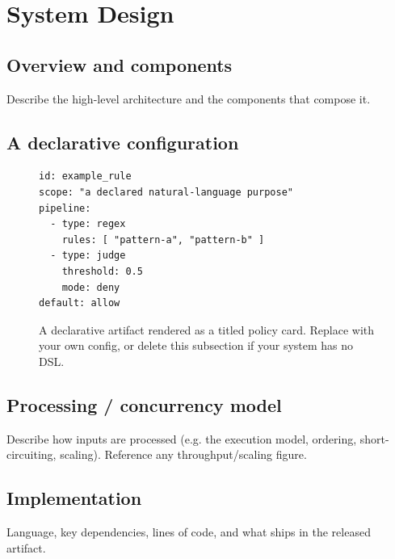 \documentclass[11pt]{article}
\begin{document}
\section{System Design}
\subsection{Overview and components}
Describe the high-level architecture and the components that compose it.

\subsection{A declarative configuration}\label{sec:language}
\begin{figure}[htb]\centering
\begin{tcolorbox}[policycard, cardcol=cardblue, title=Example policy artifact,
  width=0.8\linewidth]
\begin{lstlisting}[style=housespecyamlbare]
id: example_rule
scope: "a declared natural-language purpose"
pipeline:
  - type: regex
    rules: [ "pattern-a", "pattern-b" ]
  - type: judge
    threshold: 0.5
    mode: deny
default: allow
\end{lstlisting}
\end{tcolorbox}
\caption{A declarative artifact rendered as a titled policy card. Replace with your
own config, or delete this subsection if your system has no DSL.}
\label{fig:spec}
\end{figure}

\subsection{Processing / concurrency model}
Describe how inputs are processed (e.g. the execution model, ordering, short-circuiting,
scaling). Reference any throughput/scaling figure.

\subsection{Implementation}
Language, key dependencies, lines of code, and what ships in the released artifact.

\end{document}
